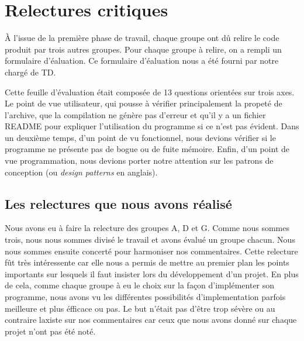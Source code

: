 \documentclass[12pt]{article}
\begin{document}
\newpage
\section{Relectures critiques}
\`A l’issue de la premi\`ere phase de travail, chaque groupe ont d\^u relire le
code produit par trois autres groupes. Pour chaque groupe \`a relire, on a
rempli un formulaire d’\'ealuation. Ce formulaire d’\'ealuation nous a \'et\'e
fourni par notre charg\'e de TD.

\par Cette feuille d'\'evaluation \'etait compos\'ee de 13 questions orient\'ees
sur trois axes. Le point de vue utilisateur, qui pousse \`a v\'erifier
principalement la propet\'e de l'archive, que la compilation ne g\'en\`ere pas
d'erreur et qu'il y a un fichier \og README \fg{} pour expliquer l'utilisation
du programme si ce n'est pas \'evident. Dans un deuxi\`eme temps, d'un point de
vu fonctionnel, nous devions v\'erifier si le programme ne pr\'esente pas de
bogue ou de fuite m\'emoire. Enfin, d'un point de vue programmation, nous
devions porter notre attention sur les patrons de conception (ou \textit{design
patterns} en anglais).

\subsection{Les relectures que nous avons r\'ealis\'e}
Nous avons eu \`a faire la relecture des groupes A, D et G. Comme nous sommes
trois, nous nous sommes divis\'e le travail et avons \'evalu\'e un groupe
chacun. Nous nous sommes ensuite concert\'e pour harmoniser nos commentaires.
Cette relecture f\^ut tr\`es int\'eressente car elle nous a permis de mettre au
premier plan les points importants sur lesquels il faut insister lors du
d\'eveloppement d'un projet. En plus de cela, comme chaque groupe à eu le choix
sur la façon d'impl\'ementer son programme, nous avons vu les diff\'erentes
possibilit\'es d'implementation parfois meilleure et plus \'efficace ou pas. Le
but n'\'etait pas d'\^etre trop s\'ev\`ere ou au contraire laxiste sur nos
commentaires car ceux que nous avons donn\'e sur chaque projet n'ont pas \'et\'e
not\'e.
\end{document}
